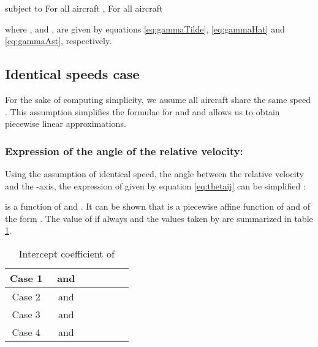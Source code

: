 \documentclass[a4paper, 10pt]{IEEEtran}
\begin{document}
subject to\newline
For all aircraft ,\newline
\hspace{1cm}For all aircraft 



where ,  and , are given by equations \ref{eq:gammaTilde}, \ref{eq:gammaHat} and \ref{eq:gammaAst}, respectively.






\subsection{Identical speeds case}
For the sake of computing simplicity, we assume all aircraft share the same speed . This assumption simplifies the formulae for  and  and allows us to obtain piecewise linear approximations. 

\subsubsection{Expression of the angle of the relative velocity: }
Using the assumption of identical speed, the angle between the relative velocity and the -axis, the expression of  given by equation \ref{eq:thetaij} can be simplified : 

 is a function of  and .  It can be shown that  is a piecewise affine function of  and  of the form . The value of  if always  and the values taken by   are summarized in table \ref{tab:ThetaijmCoef}.

\renewcommand{\arraystretch}{1.5}
\begin{table}[ht]
\begin{center}
    \begin{tabular}{|p{0.1\linewidth}|p{0.1\linewidth}|p{0.20\linewidth}|}
    \hline
    \multicolumn{1}{|c|}{Case 1}
    &\multicolumn{1}{|c|}{ and }
    &\multicolumn{1}{|l|}{}\\
    \hline
    \multicolumn{1}{|c|}{Case 2}
    &\multicolumn{1}{|c|}{ and }
    &\multicolumn{1}{|l|}{}\\
    \hline
    \multicolumn{1}{|c|}{Case 3}
    &\multicolumn{1}{|c|}{ and }
    &\multicolumn{1}{|l|}{}\\
    \hline
    \multicolumn{1}{|c|}{Case 4}
    &\multicolumn{1}{|c|}{ and }
    &\multicolumn{1}{|l|}{}\\
    \hline
    \end{tabular}\caption{Intercept coefficient of }\label{tab:ThetaijmCoef}
\end{center}
\end{table}
\end{document}
